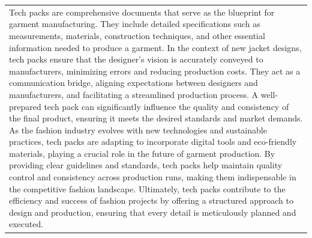 \documentclass[landscape]{article}
\begin{document}
\newpage
\noindent\begin{tabularx}{\textwidth}{|X|}
\hline
\rowcolor{headergreen}\multicolumn{1}{|c|}{\textcolor{white}{\textbf{ABOUT TECH PACKS}}} \\
\hline
Tech packs are comprehensive documents that serve as the blueprint for garment manufacturing. They include detailed specifications such as measurements, materials, construction techniques, and other essential information needed to produce a garment. In the context of new jacket designs, tech packs ensure that the designer's vision is accurately conveyed to manufacturers, minimizing errors and reducing production costs. They act as a communication bridge, aligning expectations between designers and manufacturers, and facilitating a streamlined production process. A well-prepared tech pack can significantly influence the quality and consistency of the final product, ensuring it meets the desired standards and market demands. As the fashion industry evolves with new technologies and sustainable practices, tech packs are adapting to incorporate digital tools and eco-friendly materials, playing a crucial role in the future of garment production. By providing clear guidelines and standards, tech packs help maintain quality control and consistency across production runs, making them indispensable in the competitive fashion landscape. Ultimately, tech packs contribute to the efficiency and success of fashion projects by offering a structured approach to design and production, ensuring that every detail is meticulously planned and executed.
\end{tabularx}
\hline
\end{document}
